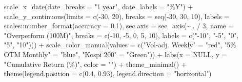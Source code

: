 \documentclass[
  a4paper,
  DIV=11,
  numbers=noendperiod]{scrreprt}
\newenvironment{Shaded}{\begin{snugshade}}{\end{snugshade}}
\newcommand{\AttributeTok}[1]{\textcolor[rgb]{0.40,0.45,0.13}{#1}}
\newcommand{\ConstantTok}[1]{\textcolor[rgb]{0.56,0.35,0.01}{#1}}
\newcommand{\DecValTok}[1]{\textcolor[rgb]{0.68,0.00,0.00}{#1}}
\newcommand{\FloatTok}[1]{\textcolor[rgb]{0.68,0.00,0.00}{#1}}
\newcommand{\FunctionTok}[1]{\textcolor[rgb]{0.28,0.35,0.67}{#1}}
\newcommand{\NormalTok}[1]{\textcolor[rgb]{0.00,0.23,0.31}{#1}}
\newcommand{\OtherTok}[1]{\textcolor[rgb]{0.00,0.23,0.31}{#1}}
\newcommand{\SpecialCharTok}[1]{\textcolor[rgb]{0.37,0.37,0.37}{#1}}
\newcommand{\StringTok}[1]{\textcolor[rgb]{0.13,0.47,0.30}{#1}}
\begin{document}
\begin{Shaded}
\begin{Highlighting}[]
  \FunctionTok{scale\_x\_date}\NormalTok{(}\AttributeTok{date\_breaks =} \StringTok{"1 year"}\NormalTok{, }\AttributeTok{date\_labels =} \StringTok{"\%Y"}\NormalTok{) }\SpecialCharTok{+}
  \FunctionTok{scale\_y\_continuous}\NormalTok{(}\AttributeTok{limits =} \FunctionTok{c}\NormalTok{(}\SpecialCharTok{{-}}\DecValTok{30}\NormalTok{, }\DecValTok{20}\NormalTok{), }\AttributeTok{breaks =} \FunctionTok{seq}\NormalTok{(}\SpecialCharTok{{-}}\DecValTok{30}\NormalTok{, }\DecValTok{30}\NormalTok{, }\DecValTok{10}\NormalTok{), }\AttributeTok{labels =}\NormalTok{ scales}\SpecialCharTok{::}\FunctionTok{number\_format}\NormalTok{(}\AttributeTok{accuracy =} \FloatTok{0.1}\NormalTok{),}
                     \AttributeTok{sec.axis =} \FunctionTok{sec\_axis}\NormalTok{(}\SpecialCharTok{\textasciitilde{}}\NormalTok{ . }\SpecialCharTok{/} \DecValTok{3}\NormalTok{, }\AttributeTok{name =} \StringTok{"Overperform (100M)"}\NormalTok{, }\AttributeTok{breaks =} \FunctionTok{c}\NormalTok{(}\SpecialCharTok{{-}}\DecValTok{10}\NormalTok{, }\SpecialCharTok{{-}}\DecValTok{5}\NormalTok{, }\DecValTok{0}\NormalTok{, }\DecValTok{5}\NormalTok{, }\DecValTok{10}\NormalTok{), }\AttributeTok{labels =} \FunctionTok{c}\NormalTok{(}\StringTok{"{-}10"}\NormalTok{, }\StringTok{"{-}5"}\NormalTok{, }\StringTok{"0"}\NormalTok{, }\StringTok{"5"}\NormalTok{, }\StringTok{"10"}\NormalTok{))) }\SpecialCharTok{+}
  \FunctionTok{scale\_color\_manual}\NormalTok{(}\AttributeTok{values =} \FunctionTok{c}\NormalTok{(}\StringTok{"Vol{-}adj. Weekly"} \OtherTok{=} \StringTok{"red"}\NormalTok{, }\StringTok{"5\% OTM Monthly"} \OtherTok{=} \StringTok{"blue"}\NormalTok{, }\StringTok{"Kospi 200"} \OtherTok{=} \StringTok{"Green"}\NormalTok{)) }\SpecialCharTok{+}
  \FunctionTok{labs}\NormalTok{(}\AttributeTok{x =} \ConstantTok{NULL}\NormalTok{, }\AttributeTok{y =} \StringTok{"Cumulative Return (\%)"}\NormalTok{, }\AttributeTok{color =} \StringTok{""}\NormalTok{) }\SpecialCharTok{+}
  \FunctionTok{theme\_minimal}\NormalTok{() }\SpecialCharTok{+}
  \FunctionTok{theme}\NormalTok{(}\AttributeTok{legend.position =} \FunctionTok{c}\NormalTok{(}\FloatTok{0.4}\NormalTok{, }\FloatTok{0.93}\NormalTok{), }\AttributeTok{legend.direction =} \StringTok{"horizontal"}\NormalTok{)}


\end{Highlighting}
\end{Shaded}
\end{document}
